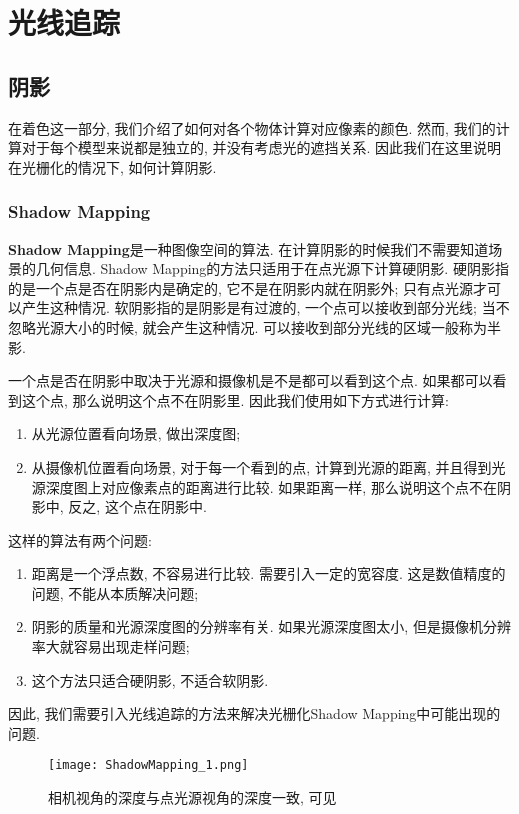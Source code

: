 \part{光线追踪}

\chapter{阴影}

在着色这一部分, 我们介绍了如何对各个物体计算对应像素的颜色. 然而, 我们的计算对于每个模型来说都是独立的, 并没有考虑光的遮挡关系. 因此我们在这里说明在光栅化的情况下, 如何计算阴影. 

\section{Shadow Mapping}
\textbf{Shadow Mapping}是一种图像空间的算法. 在计算阴影的时候我们不需要知道场景的几何信息. Shadow Mapping的方法只适用于在点光源下计算硬阴影.
硬阴影指的是一个点是否在阴影内是确定的, 它不是在阴影内就在阴影外; 只有点光源才可以产生这种情况. 软阴影指的是阴影是有过渡的, 一个点可以接收到部分光线; 当不忽略光源大小的时候, 就会产生这种情况.
可以接收到部分光线的区域一般称为半影. 

一个点是否在阴影中取决于光源和摄像机是不是都可以看到这个点. 如果都可以看到这个点, 那么说明这个点不在阴影里. 因此我们使用如下方式进行计算: 
\begin{enumerate}
	\item 从光源位置看向场景, 做出深度图; 
	\item 从摄像机位置看向场景, 对于每一个看到的点, 计算到光源的距离, 并且得到光源深度图上对应像素点的距离进行比较. 如果距离一样, 那么说明这个点不在阴影中, 反之, 这个点在阴影中. 
\end{enumerate}

这样的算法有两个问题: 
\begin{enumerate}
	\item 距离是一个浮点数, 不容易进行比较. 需要引入一定的宽容度. 这是数值精度的问题, 不能从本质解决问题; 
	\item 阴影的质量和光源深度图的分辨率有关. 如果光源深度图太小, 但是摄像机分辨率大就容易出现走样问题; 
	\item 这个方法只适合硬阴影, 不适合软阴影. 
\end{enumerate}

因此, 我们需要引入光线追踪的方法来解决光栅化Shadow Mapping中可能出现的问题. 

\begin{figure}[H]
	\centering
	\texttt{[image: ShadowMapping\_1.png]}
	\caption{相机视角的深度与点光源视角的深度一致, 可见}
	\label{fig:ShadowMapping_1}
\end{figure}

